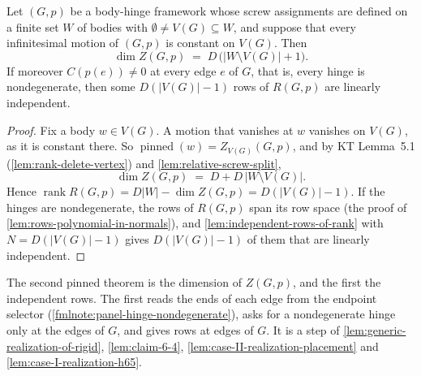 \begin{lemma}
  \label{lem:case-II-placement-old-rows-extract}
  \leanok
  Let $(G,p)$ be a body-hinge framework whose screw assignments are
  defined on a finite set $W$ of bodies with
  $\emptyset \neq V(G) \subseteq W$, and suppose that every
  infinitesimal motion of $(G,p)$ is constant on $V(G)$. Then
  \[
    \dim Z(G,p) \;=\; D\,\bigl(|W \setminus V(G)| + 1\bigr).
  \]
  If moreover $C(p(e)) \neq 0$ at every edge $e$ of $G$, that is, every
  hinge is nondegenerate, then some $D(|V(G)| - 1)$ rows of $R(G,p)$ are
  linearly independent.
\end{lemma}
\begin{proof}
  \leanok
  Fix a body $w \in V(G)$. A motion that vanishes at $w$ vanishes on
  $V(G)$, as it is constant there. So
  $\operatorname{pinned}(w) = Z_{V(G)}(G,p)$, and by KT Lemma~5.1
  (\cref{lem:rank-delete-vertex}) and \cref{lem:relative-screw-split},
  \[
    \dim Z(G,p) \;=\; D + D\,|W \setminus V(G)|.
  \]
  Hence
  $\operatorname{rank} R(G,p) = D|W| - \dim Z(G,p) = D(|V(G)| - 1)$. If
  the hinges are nondegenerate, the rows of $R(G,p)$ span its row space
  (the proof of \cref{lem:rows-polynomial-in-normals}), and
  \cref{lem:independent-rows-of-rank} with $N = D(|V(G)| - 1)$ gives
  $D(|V(G)| - 1)$ of them that are linearly independent.
\end{proof}

\begin{fmlnote}
  The second pinned theorem is the dimension of $Z(G,p)$, and the first
  the independent rows. The first reads the ends of each edge from the
  endpoint selector (\cref{fmlnote:panel-hinge-nondegenerate}), asks for
  a nondegenerate hinge only at the edges of $G$, and gives rows at edges
  of $G$. It is a step of \cref{lem:generic-realization-of-rigid},
  \cref{lem:claim-6-4}, \cref{lem:case-II-realization-placement} and
  \cref{lem:case-I-realization-h65}.
\end{fmlnote}

